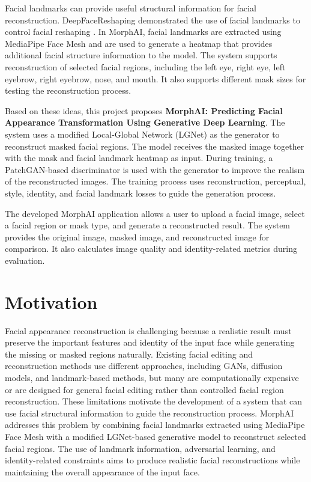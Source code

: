 \newpage
\noindent Facial landmarks can provide useful structural information for facial reconstruction. DeepFaceReshaping demonstrated the use of facial landmarks to control facial reshaping \cite{chen2024deepface}. In MorphAI, facial landmarks are extracted using MediaPipe Face Mesh and are used to generate a heatmap that provides additional facial structure information to the model. The system supports reconstruction of selected facial regions, including the left eye, right eye, left eyebrow, right eyebrow, nose, and mouth. It also supports different mask sizes for testing the reconstruction process.

\noindent Based on these ideas, this project proposes \textbf{MorphAI: Predicting Facial Appearance Transformation Using Generative Deep Learning}. The system uses a modified Local-Global Network (LGNet) as the generator to reconstruct masked facial regions. The model receives the masked image together with the mask and facial landmark heatmap as input. During training, a PatchGAN-based discriminator is used with the generator to improve the realism of the reconstructed images. The training process uses reconstruction, perceptual, style, identity, and facial landmark losses to guide the generation process.

\noindent The developed MorphAI application allows a user to upload a facial image, select a facial region or mask type, and generate a reconstructed result. The system provides the original image, masked image, and reconstructed image for comparison. It also calculates image quality and identity-related metrics during evaluation.


        \section{Motivation}
Facial appearance reconstruction is challenging because a realistic result must preserve the important features and identity of the input face while generating the missing or masked regions naturally. Existing facial editing and reconstruction methods use different approaches, including GANs, diffusion models, and landmark-based methods, but many are computationally expensive or are designed for general facial editing rather than controlled facial region reconstruction. These limitations motivate the development of a system that can use facial structural information to guide the reconstruction process. MorphAI addresses this problem by combining facial landmarks extracted using MediaPipe Face Mesh with a modified LGNet-based generative model to reconstruct selected facial regions. The use of landmark information, adversarial learning, and identity-related constraints aims to produce realistic facial reconstructions while maintaining the overall appearance of the input face.


